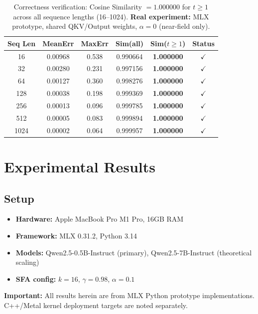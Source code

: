 \documentclass[11pt]{article}
\begin{document}
\begin{table}[h]
\centering
\begin{tabular}{cccccc}
\toprule
Seq Len & MeanErr & MaxErr & Sim(all) & Sim($t \geq 1$) & Status \\
\midrule
16 & 0.00968 & 0.538 & 0.990664 & \textbf{1.000000} & $\checkmark$ \\
32 & 0.00280 & 0.231 & 0.997156 & \textbf{1.000000} & $\checkmark$ \\
64 & 0.00127 & 0.360 & 0.998276 & \textbf{1.000000} & $\checkmark$ \\
128 & 0.00038 & 0.198 & 0.999369 & \textbf{1.000000} & $\checkmark$ \\
256 & 0.00013 & 0.096 & 0.999785 & \textbf{1.000000} & $\checkmark$ \\
512 & 0.00005 & 0.083 & 0.999894 & \textbf{1.000000} & $\checkmark$ \\
1024 & 0.00002 & 0.064 & 0.999957 & \textbf{1.000000} & $\checkmark$ \\
\bottomrule
\end{tabular}
\caption{Correctness verification: Cosine Similarity $= 1.000000$ for $t \geq 1$ across all sequence lengths (16--1024). \textbf{Real experiment:} MLX prototype, shared QKV/Output weights, $\alpha=0$ (near-field only).}
\end{table}

\section{Experimental Results}

\subsection{Setup}

\begin{itemize}
    \item \textbf{Hardware:} Apple MacBook Pro M1 Pro, 16GB RAM
    \item \textbf{Framework:} MLX 0.31.2, Python 3.14
    \item \textbf{Models:} Qwen2.5-0.5B-Instruct (primary), Qwen2.5-7B-Instruct (theoretical scaling)
    \item \textbf{SFA config:} $k=16$, $\gamma=0.98$, $\alpha=0.1$
\end{itemize}

\noindent\textbf{Important:} All results herein are from MLX Python prototype implementations. C++/Metal kernel deployment targets are noted separately.
\end{document}
